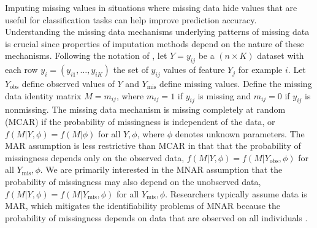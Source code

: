 \documentclass[10pt]{book}
\theoremstyle{definition}
\begin{document}
Imputing missing values in situations where missing data hide values that are useful for classification tasks can help improve prediction accuracy. Understanding the missing data mechanisms underlying patterns of missing data is crucial since properties of imputation methods depend on the nature of these mechanisms. Following the notation of \cite[Chap.~1]{little2014}, let $Y = y_{ij}$ be a $(n \times K)$ dataset with each row $y_i = (y_{i1}, \ldots, y_{iK})$ the set of $y_{ij}$ values of feature $Y_j$ for example $i$. Let $Y_{\mathrm{obs}}$ define observed values of $Y$ and $Y_{\mathrm{mis}}$ define missing values. Define the missing data identity matrix $M = m_{ij}$, where $m_{ij} = 1$ if $y_{ij}$ is missing and $m_{ij} = 0$ if $y_{ij}$ is nonmissing. The missing data mechanism is missing completely at random (MCAR) if the probability of missingness is independent of the data, or $f(M | Y, \phi) = f(M | \phi)$ for all $Y, \phi$, where $\phi$ denotes unknown parameters. The MAR assumption is less restrictive than MCAR in that that the probability of missingness depends only on the observed data, $f(M | Y, \phi) = f(M | Y_{\mathrm{obs}}, \phi)$ for all $Y_{\mathrm{mis}}, \phi$. We are primarily interested in the MNAR assumption that the probability of missingness may also depend on the unobserved data, $f(M | Y, \phi) = f(M | Y_{\mathrm{mis}}, \phi)$ for all $Y_{\mathrm{mis}}, \phi$. Researchers typically assume data is MAR, which mitigates the identifiability problems of MNAR because the probability of missingness depends on data that are observed on all individuals \citep[Chap.~6]{tsiatis2007}. 

\par			
{} \label{section:techniques} 
\end{document}
